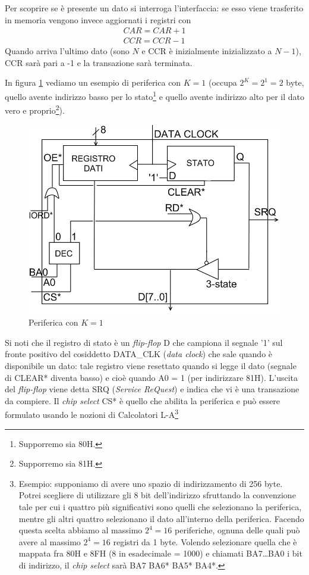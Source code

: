 Per scoprire se è presente un dato si interroga l'interfaccia: se esso viene trasferito in memoria vengono invece aggiornati i registri con
\[
\begin{gathered}
CAR=CAR+1\\
CCR=CCR-1
\end{gathered}
\]
Quando arriva l'ultimo dato (sono $N$ e CCR è inizialmente inizializzato a $N-1$), CCR sarà pari a -1 e la transazione sarà terminata.

In figura \ref{fig:periferica8} vediamo un esempio di periferica con $K=1$ (occupa $2^K=2^1=2$ byte, quello avente indirizzo basso per lo stato\footnote{Supporremo sia 80H.} e quello avente indirizzo alto per il dato vero e proprio\footnote{Supporremo sia 81H.}).

\begin{figure}[!h]
\centering
\includegraphics[width=0.65\columnwidth]{img/periferica8}
\caption{Periferica con $K=1$}
\label{fig:periferica8}
\end{figure}

Si noti che il registro di stato è un \textit{flip-flop} D che campiona il segnale '1' sul fronte positivo del cosiddetto DATA\_CLK (\textit{data clock}) che sale quando è disponibile un dato: tale registro viene resettato quando si legge il dato (segnale di CLEAR* diventa basso) e cioè quando A0 = 1 (per indirizzare 81H). 
L'uscita del \textit{flip-flop} viene detta SRQ (\textit{Service ReQuest}) e indica che vi è una transazione da compiere.
Il \textit{chip select} CS* è quello che abilita la periferica e può essere formulato usando le nozioni di Calcolatori L-A\footnote{Esempio: supponiamo di avere uno spazio di indirizzamento di 256 byte. Potrei scegliere di utilizzare gli 8 bit dell'indirizzo sfruttando la convenzione tale per cui i quattro più significativi sono quelli che selezionano la periferica, mentre gli altri quattro selezionano il dato all'interno della periferica. Facendo questa scelta abbiamo al massimo $2^4=16$ periferiche, ognuna delle quali può avere al massimo $2^4=16$ registri da 1 byte. Volendo selezionare quella che è mappata fra 80H e 8FH (8 in esadecimale = 1000) e chiamati BA7\ldots BA0 i bit di indirizzo, il \textit{chip select} sarà BA7 BA6* BA5* BA4*.}

